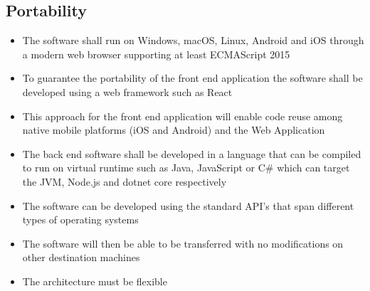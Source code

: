 \subsection{Portability}
\begin{itemize}
  \item The software shall run on Windows, macOS, Linux, Android and iOS through a modern web browser supporting at least ECMAScript 2015
  \item To guarantee the portability of the front end application the software shall be developed using a web framework such as React
  \item This approach for the front end application will enable code reuse among native mobile platforms (iOS and Android) and the Web Application
  \item The back end software shall be developed in a language that can be compiled to run on virtual runtime such as Java, JavaScript or C\# which can target the JVM, Node.js and dotnet core respectively
  \item The software can be developed using the standard API's that span different types of operating systems
  \item The software will then be able to be transferred with no modifications on other destination machines
  \item The architecture must be flexible
\end{itemize}
